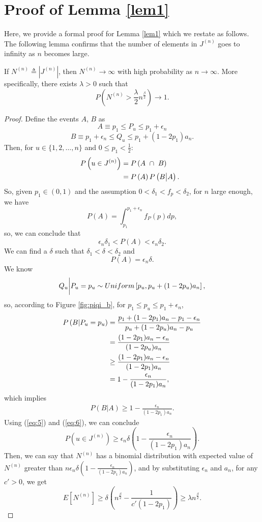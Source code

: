 \section{Proof of Lemma \ref{lem1}}
\label{sec:app_c}
Here, we provide a formal proof for Lemma \ref{lem1} which we restate as follows. The following lemma confirms that the number of elements in $J^{(n)}$ goes to infinity as $n$ becomes large.

	If $N^{(n)} \triangleq |J^{(n)}| $, then $N^{(n)} \rightarrow \infty$ with high probability as $n \rightarrow \infty$.  More specifically, there exists $\lambda>0$ such that
\[
	P\left(N^{(n)} > \frac{\lambda}{2}n^{\frac{\beta}{2}}\right) \rightarrow 1.
	\]

\begin{proof}
Define the events $A$, $B$ as
\[A \equiv  p_1\leq P_u\leq p_1+\epsilon_n\]
\[B \equiv p_1+\epsilon_n\leq Q_u\leq p_1+(1-2p_1)a_n.\]
Then, for $u \in \{1, 2, \dots, n\}$ and $0\leq p_1<\frac{1}{2}$:
	\begin{align}
	\nonumber P\left(u\in J^{(n)}\right) &= P\left(A\ \cap \ B\right)\\
	\nonumber &= P\left(A\right) P\left(B \big{|}A \right). \ \
	\end{align}		
So, given $p_1 \in (0,1)$ and the assumption $0<\delta_1<f_p<\delta_2$, for $n$ large enough, we have
	\[
	P(A)  = \int_{p_1}^{ p_1+\epsilon_n}f_P(p) dp,
	\]
so, we can conclude that
	\[
	\epsilon_n\delta_1<P(A) <\epsilon_n\delta_2.
	\]
	We can find a $\delta$ such that $\delta_1<\delta<\delta_2$ and
\begin{equation}\label{eq:5}
	P( A) = \epsilon_n\delta.
\end{equation}
We know
	\[Q_u\bigg{|}P_u=p_u \sim Uniform \left[p_u,p_u+(1-2p_u)a_n\right],\]
	so, according to Figure \ref{fig:piqi_b}, for $p_1\leq p_u\leq p_1+\epsilon_n$,
	\begin{align}
	\nonumber P\left(B | P_u=p_u\right ) &= \frac{p_1+(1-2p_1)a_n-p_1-\epsilon_n}{p_u+(1-2p_u)a_n-p_u} \\
	\nonumber &= \frac{(1-2p_1)a_n-\epsilon_n}{(1-2p_u)a_n}\\
	\nonumber &\geq \frac{(1-2p_1)a_n-\epsilon_n}{(1-2p_1)a_n} \\
	\nonumber &= 1- \frac{\epsilon_n}{(1-2p_1)a_n}, \ \
	\end{align}
which implies
\begin{align}
P\left(B | A\right ) \geq 1- \frac{\epsilon_n}{(1-2p_1)a_n}. \label{eq:6}
\end{align}
Using (\ref{eq:5}) and (\ref{eq:6}), we can conclude
	\[P\left(u\in J^{(n)}\right)\geq \epsilon_n\delta \left(1- \frac{\epsilon_n}{(1-2p_1)a_n}\right).\]
Then, we can say that $N^{(n)}$ has a binomial distribution with expected value of $N^{(n)}$ greater than $n\epsilon_n\delta \left(1- \frac{\epsilon_n}{(1-2p_1)a_n}\right)$, and by substituting $\epsilon_n$ and $a_n$, for any $c'>0$, we get
\[E\left[N^{(n)}\right] \geq \delta\left(n^{\frac{\beta}{2}}- \frac{1}{{c'(1-2p_1)}}\right)   \geq  \lambda n^{\frac{\beta}{2}}.\]


\end{proof}
